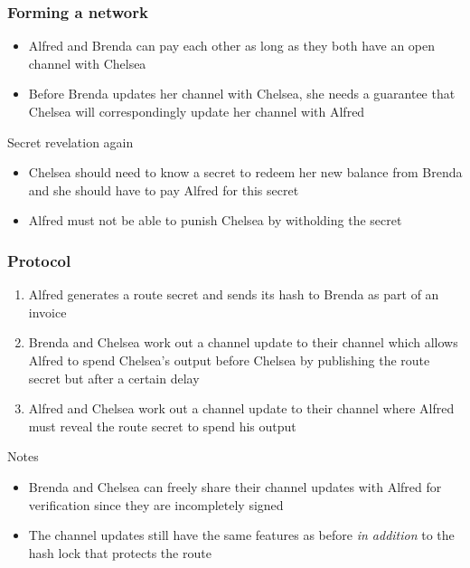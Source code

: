 \documentclass{beamer}
\begin{document}
\begin{frame}
	\frametitle{Forming a network}
	\begin{itemize}
		\item Alfred and Brenda can pay each other as long as they both have an 
			open channel with Chelsea \pause
		\item Before Brenda updates her channel with Chelsea, she needs a guarantee 
			that Chelsea will correspondingly update her channel with Alfred \pause
	\end{itemize}
	\begin{block}{Secret revelation again}
		\begin{itemize}
			\item Chelsea should need to know a secret to redeem her new balance from Brenda and 
				she should have to pay Alfred for this secret \pause
			\item Alfred must not be able to punish Chelsea by witholding the secret 
		\end{itemize}
	\end{block}
\end{frame}
\begin{frame}
	\frametitle{Protocol}
	\begin{enumerate}
		\item Alfred generates a route secret and sends its hash to Brenda as part of an invoice \pause
		\item Brenda and Chelsea work out a channel update to their channel which allows Alfred to 
			spend Chelsea's output before Chelsea by publishing the route secret but after a certain delay \pause
		\item Alfred and Chelsea work out a channel update to their channel where 
			Alfred must reveal the route secret to spend his output \pause
	\end{enumerate}
	\begin{block}{Notes}
		\begin{itemize}
			\item Brenda and Chelsea can freely share their channel updates with 
				Alfred for verification since they are incompletely signed	\pause
			\item The channel updates still have the same features as before \emph{in 
				addition} to the hash lock that protects the route 
		\end{itemize}
	\end{block}
\end{frame}
\end{document}
